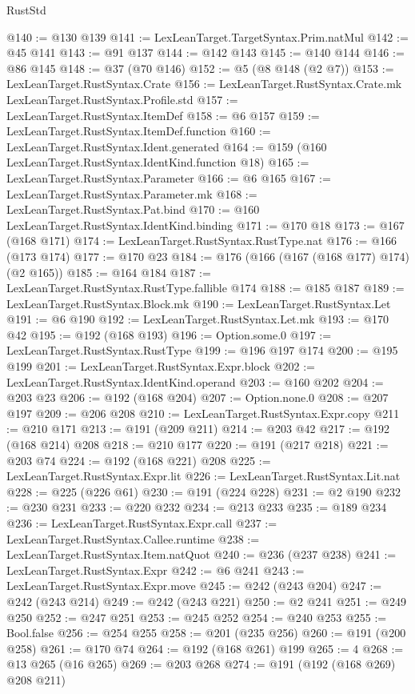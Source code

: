 \begin{lexlean}{RustStd}
\begin{coremodule}
@140 := @130 @139
@141 := LexLeanTarget.TargetSyntax.Prim.natMul
@142 := @45 @141
@143 := @91 @137
@144 := @142 @143
@145 := @140 @144
@146 := @86 @145
@148 := @37 (@70 @146)
@152 := @5 (@8 @148 (@2 @7))
@153 := LexLeanTarget.RustSyntax.Crate
@156 := LexLeanTarget.RustSyntax.Crate.mk LexLeanTarget.RustSyntax.Profile.std
@157 := LexLeanTarget.RustSyntax.ItemDef
@158 := @6 @157
@159 := LexLeanTarget.RustSyntax.ItemDef.function
@160 := LexLeanTarget.RustSyntax.Ident.generated
@164 := @159 (@160 LexLeanTarget.RustSyntax.IdentKind.function @18)
@165 := LexLeanTarget.RustSyntax.Parameter
@166 := @6 @165
@167 := LexLeanTarget.RustSyntax.Parameter.mk
@168 := LexLeanTarget.RustSyntax.Pat.bind
@170 := @160 LexLeanTarget.RustSyntax.IdentKind.binding
@171 := @170 @18
@173 := @167 (@168 @171)
@174 := LexLeanTarget.RustSyntax.RustType.nat
@176 := @166 (@173 @174)
@177 := @170 @23
@184 := @176 (@166 (@167 (@168 @177) @174) (@2 @165))
@185 := @164 @184
@187 := LexLeanTarget.RustSyntax.RustType.fallible @174
@188 := @185 @187
@189 := LexLeanTarget.RustSyntax.Block.mk
@190 := LexLeanTarget.RustSyntax.Let
@191 := @6 @190
@192 := LexLeanTarget.RustSyntax.Let.mk
@193 := @170 @42
@195 := @192 (@168 @193)
@196 := Option.some.{0}
@197 := LexLeanTarget.RustSyntax.RustType
@199 := @196 @197 @174
@200 := @195 @199
@201 := LexLeanTarget.RustSyntax.Expr.block
@202 := LexLeanTarget.RustSyntax.IdentKind.operand
@203 := @160 @202
@204 := @203 @23
@206 := @192 (@168 @204)
@207 := Option.none.{0}
@208 := @207 @197
@209 := @206 @208
@210 := LexLeanTarget.RustSyntax.Expr.copy
@211 := @210 @171
@213 := @191 (@209 @211)
@214 := @203 @42
@217 := @192 (@168 @214) @208
@218 := @210 @177
@220 := @191 (@217 @218)
@221 := @203 @74
@224 := @192 (@168 @221) @208
@225 := LexLeanTarget.RustSyntax.Expr.lit
@226 := LexLeanTarget.RustSyntax.Lit.nat
@228 := @225 (@226 @61)
@230 := @191 (@224 @228)
@231 := @2 @190
@232 := @230 @231
@233 := @220 @232
@234 := @213 @233
@235 := @189 @234
@236 := LexLeanTarget.RustSyntax.Expr.call
@237 := LexLeanTarget.RustSyntax.Callee.runtime
@238 := LexLeanTarget.RustSyntax.Item.natQuot
@240 := @236 (@237 @238)
@241 := LexLeanTarget.RustSyntax.Expr
@242 := @6 @241
@243 := LexLeanTarget.RustSyntax.Expr.move
@245 := @242 (@243 @204)
@247 := @242 (@243 @214)
@249 := @242 (@243 @221)
@250 := @2 @241
@251 := @249 @250
@252 := @247 @251
@253 := @245 @252
@254 := @240 @253
@255 := Bool.false
@256 := @254 @255
@258 := @201 (@235 @256)
@260 := @191 (@200 @258)
@261 := @170 @74
@264 := @192 (@168 @261) @199
@265 := 4
@268 := @13 @265 (@16 @265)
@269 := @203 @268
@274 := @191 (@192 (@168 @269) @208 @211)

\end{coremodule}
\end{lexlean}
